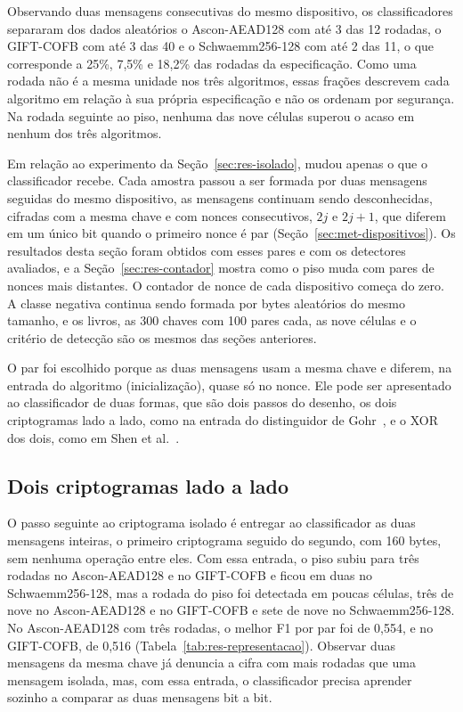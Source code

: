 Observando duas mensagens consecutivas do mesmo dispositivo, os classificadores separaram dos dados aleatórios o Ascon-AEAD128 com até 3 das 12 rodadas, o GIFT-COFB com até 3 das 40 e o Schwaemm256-128 com até 2 das 11, o que corresponde a 25\%, 7,5\% e 18,2\% das rodadas da especificação. Como uma rodada não é a mesma unidade nos três algoritmos, essas frações descrevem cada algoritmo em relação à sua própria especificação e não os ordenam por segurança. Na rodada seguinte ao piso, nenhuma das nove células superou o acaso em nenhum dos três algoritmos.

Em relação ao experimento da Seção~\ref{sec:res-isolado}, mudou apenas o que o classificador recebe. Cada amostra passou a ser formada por duas mensagens seguidas do mesmo dispositivo, as mensagens continuam sendo desconhecidas, cifradas com a mesma chave e com nonces consecutivos, $2j$ e $2j+1$, que diferem em um único bit quando o primeiro nonce é par (Seção~\ref{sec:met-dispositivos}). Os resultados desta seção foram obtidos com esses pares e com os detectores avaliados, e a Seção~\ref{sec:res-contador} mostra como o piso muda com pares de nonces mais distantes. O contador de nonce de cada dispositivo começa do zero. A classe negativa continua sendo formada por bytes aleatórios do mesmo tamanho, e os livros, as 300 chaves com 100 pares cada, as nove células e o critério de detecção são os mesmos das seções anteriores.

O par foi escolhido porque as duas mensagens usam a mesma chave e diferem, na entrada do algoritmo (inicialização), quase só no nonce. Ele pode ser apresentado ao classificador de duas formas, que são dois passos do desenho, os dois criptogramas lado a lado, como na entrada do distinguidor de Gohr~\cite{gohr_2019}, e o XOR dos dois, como em Shen et al.~\cite{Shen2024ND}.

\subsection{Dois criptogramas lado a lado}
\label{sec:res-lado-a-lado}

O passo seguinte ao criptograma isolado é entregar ao classificador as duas mensagens inteiras, o primeiro criptograma seguido do segundo, com 160 bytes, sem nenhuma operação entre eles. Com essa entrada, o piso subiu para três rodadas no Ascon-AEAD128 e no GIFT-COFB e ficou em duas no Schwaemm256-128, mas a rodada do piso foi detectada em poucas células, três de nove no Ascon-AEAD128 e no GIFT-COFB e sete de nove no Schwaemm256-128. No Ascon-AEAD128 com três rodadas, o melhor F1 por par foi de 0,554, e no GIFT-COFB, de 0,516 (Tabela~\ref{tab:res-representacao}). Observar duas mensagens da mesma chave já denuncia a cifra com mais rodadas que uma mensagem isolada, mas, com essa entrada, o classificador precisa aprender sozinho a comparar as duas mensagens bit a bit.

